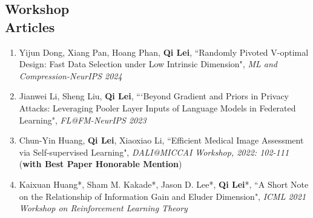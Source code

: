 \documentclass[margin, 10pt]{res} %
\begin{document}
\begin{resume}
\section{Workshop\\Articles}
\begin{enumerate}
	\item{Yijun Dong, Xiang Pan, Hoang Phan, \textbf{Qi Lei}, ``Randomly Pivoted V-optimal Design: Fast Data Selection under Low Intrinsic Dimension", \textit{ML and Compression-NeurIPS 2024 }}
	\item{Jianwei Li, Sheng Liu, \textbf{Qi Lei}, ``‘Beyond Gradient and Priors in Privacy Attacks: Leveraging Pooler Layer Inputs of Language Models in Federated Learning", \textit{FL@FM-NeurIPS 2023}
}
	\item{Chun-Yin Huang, \textbf{Qi Lei}, Xiaoxiao Li, ``Efficient Medical Image Assessment via Self-supervised Learning", \textit{DALI@MICCAI Workshop, 2022: 102-111} (\textbf{with Best Paper Honorable Mention})}
	\item {Kaixuan Huang*, Sham M. Kakade*, Jason D. Lee*, \textbf{Qi Lei}*,  ``A Short Note on the Relationship of Information Gain and Eluder Dimension", \textit{ICML 2021 Workshop on Reinforcement Learning Theory} }
	

	
	

\end{enumerate}
\end{resume}
\end{document}
